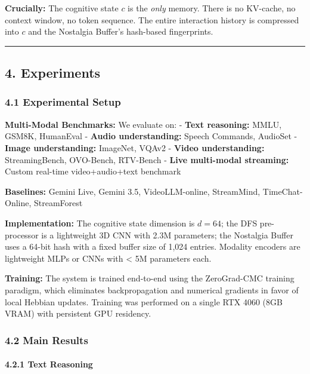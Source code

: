 \documentclass[
  11pt,
  a4paper,
]{article}
\begin{document}
\textbf{Crucially:} The cognitive state \(c\) is the \emph{only} memory.
There is no KV-cache, no context window, no token sequence. The entire
interaction history is compressed into \(c\) and the Nostalgia Buffer's
hash-based fingerprints.

\begin{center}\rule{0.5\linewidth}{0.5pt}\end{center}

\subsection{4. Experiments}\label{experiments}

\subsubsection{4.1 Experimental Setup}\label{experimental-setup}

\textbf{Multi-Modal Benchmarks:} We evaluate on: - \textbf{Text
reasoning:} MMLU, GSM8K, HumanEval - \textbf{Audio understanding:}
Speech Commands, AudioSet - \textbf{Image understanding:} ImageNet,
VQAv2 - \textbf{Video understanding:} StreamingBench, OVO-Bench,
RTV-Bench - \textbf{Live multi-modal streaming:} Custom real-time
video+audio+text benchmark

\textbf{Baselines:} Gemini Live, Gemini 3.5, VideoLLM-online,
StreamMind, TimeChat-Online, StreamForest

\textbf{Implementation:} The cognitive state dimension is \(d = 64\);
the DFS pre-processor is a lightweight 3D CNN with 2.3M parameters; the
Nostalgia Buffer uses a 64-bit hash with a fixed buffer size of 1,024
entries. Modality encoders are lightweight MLPs or CNNs with \textless{}
5M parameters each.

\textbf{Training:} The system is trained end-to-end using the
ZeroGrad-CMC training paradigm, which eliminates backpropagation and
numerical gradients in favor of local Hebbian updates. Training was
performed on a single RTX 4060 (8GB VRAM) with persistent GPU residency.

\subsubsection{4.2 Main Results}\label{main-results}

\paragraph{4.2.1 Text Reasoning}\label{text-reasoning}
\end{document}
